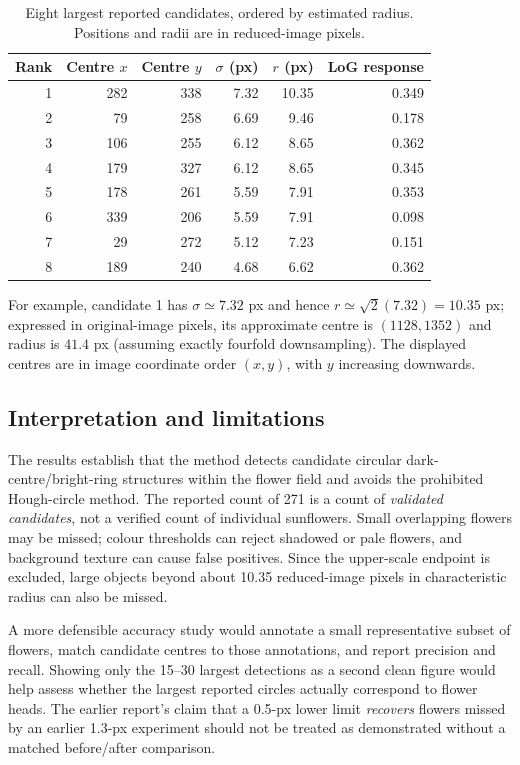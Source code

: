 \documentclass[11pt,a4paper]{article}
\begin{document}
\begin{table}[H]\centering
\caption{Eight largest reported candidates, ordered by estimated radius. Positions and radii are in reduced-image pixels.}
\begin{tabular}{@{}rrrrrr@{}}\toprule
Rank & Centre $x$ & Centre $y$ & $\sigma$ (px) & $r$ (px) & LoG response\\\midrule
1 & 282 & 338 & 7.32 & 10.35 & 0.349\\
2 & 79  & 258 & 6.69 & 9.46 & 0.178\\
3 & 106 & 255 & 6.12 & 8.65 & 0.362\\
4 & 179 & 327 & 6.12 & 8.65 & 0.345\\
5 & 178 & 261 & 5.59 & 7.91 & 0.353\\
6 & 339 & 206 & 5.59 & 7.91 & 0.098\\
7 & 29  & 272 & 5.12 & 7.23 & 0.151\\
8 & 189 & 240 & 4.68 & 6.62 & 0.362\\
\bottomrule\end{tabular}
\end{table}

For example, candidate 1 has $\sigma\simeq7.32$ px and hence $r\simeq\sqrt{2}(7.32)=10.35$ px; expressed in original-image pixels, its approximate centre is $(1128,1352)$ and radius is $41.4$ px (assuming exactly fourfold downsampling). The displayed centres are in image coordinate order $(x,y)$, with $y$ increasing downwards.

\subsection{Interpretation and limitations}
The results establish that the method detects candidate circular dark-centre/bright-ring structures within the flower field and avoids the prohibited Hough-circle method. The reported count of 271 is a count of \emph{validated candidates}, not a verified count of individual sunflowers. Small overlapping flowers may be missed; colour thresholds can reject shadowed or pale flowers, and background texture can cause false positives. Since the upper-scale endpoint is excluded, large objects beyond about 10.35 reduced-image pixels in characteristic radius can also be missed.

A more defensible accuracy study would annotate a small representative subset of flowers, match candidate centres to those annotations, and report precision and recall. Showing only the 15--30 largest detections as a second clean figure would help assess whether the largest reported circles actually correspond to flower heads. The earlier report's claim that a 0.5-px lower limit \emph{recovers} flowers missed by an earlier 1.3-px experiment should not be treated as demonstrated without a matched before/after comparison.
\end{document}
